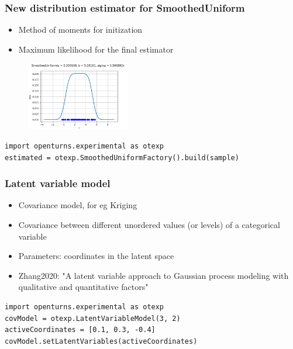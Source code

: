 \documentclass[aspectratio=169]{beamer}
\begin{document}

\begin{frame}[containsverbatim]
\frametitle{New distribution estimator for SmoothedUniform}

\begin{itemize}
\item Method of moments for initization
\item Maximum likelihood for the final estimator
\end{itemize}

\begin{figure}
   \includegraphics[width=0.4\textwidth]{figures/SmoothedUniformFactory}
\end{figure}

\begin{small}
\begin{lstlisting}
import openturns.experimental as otexp
estimated = otexp.SmoothedUniformFactory().build(sample)
\end{lstlisting}
\end{small}


\end{frame}


\begin{frame}[containsverbatim]
\frametitle{Latent variable model}

\begin{itemize}
\item Covariance model, for eg Kriging
\item Covariance between different unordered values (or levels) of a categorical variable
\item Parameters: coordinates in the latent space
\item Zhang2020: "A latent variable approach to Gaussian process modeling with qualitative and quantitative factors"
\end{itemize}

\vspace{30pt}

\begin{small}
\begin{lstlisting}
import openturns.experimental as otexp
covModel = otexp.LatentVariableModel(3, 2)
activeCoordinates = [0.1, 0.3, -0.4]
covModel.setLatentVariables(activeCoordinates)
\end{lstlisting}
\end{small}

\end{frame}
\end{document}
